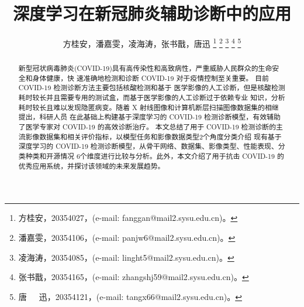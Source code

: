 \documentclass[journal,twoside,web]{ieeecolor}
\begin{document}
\title{深度学习在新冠肺炎辅助诊断中的应用}
\author{方桂安，潘嘉雯，凌海涛，张书戬，唐迅
\thanks{方桂安，20354027，(e-mail: fanggan@mail2.sysu.edu.cn)。}
\thanks{潘嘉雯，20354106，(e-mail: panjw6@mail2.sysu.edu.cn)。}
\thanks{凌海涛，20354085，(e-mail: linght5@mail2.sysu.edu.cn)。}
\thanks{张书戬，20354165，(e-mail: zhangshj59@mail2.sysu.edu.cn)。}
\thanks{唐~~~迅，20354121，(e-mail: tangx66@mail2.sysu.edu.cn)。}}

\maketitle

\begin{abstract}
新型冠状病毒肺炎(COVID-19)具有高传染性和高致病性，严重威胁人民群众的生命安全和身体健康，快  
速准确地检测和诊断 COVID-19 对于疫情控制至关重要。 
目前 COVID-19 检测诊断方法主要包括核酸检测和基于  
医学影像的人工诊断，但是核酸检测耗时较长并且需要专用的测试盒，而基于医学影像的人工诊断过于依赖专业  
知识，分析耗时较长且难以发现隐匿病变。随着 X 射线图像和计算机断层扫描图像数据集的相继提出，科研人员  
在此基础上构建基于深度学习的 COVID-19 检测诊断模型，有效辅助了医学专家对 COVID-19 的高效诊断治疗。 
本文总结了用于 COVID-19 检测诊断的主流影像数据集和相关评价指标，以模型任务和影像数据类型2个角度分类介绍  
现有基于深度学习的 COVID-19 检测诊断模型，从骨干网络、数据集、影像类型、性能表现、分类种类和开源情况  
6个维度进行比较与分析。此外，本文介绍了用于抗击 COVID-19 的优秀应用系统，并探讨该领域的未来发展趋势。
\end{abstract}
\end{document}
